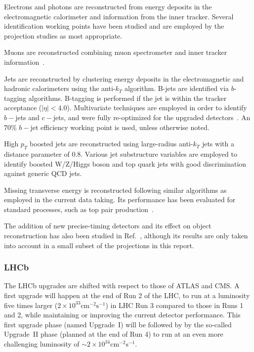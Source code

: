 Electrons and photons are reconstructed from energy deposits in the electromagnetic calorimeter and information from the inner tracker\cite{ATLAS_LAr_TDR,CMS_Barrel_TDR,Collaboration:2293646,CMS_MTD_TP}.
Several identification working points have been studied and are employed by the projection studies as most appropriate.

Muons are reconstructed combining muon spectrometer and inner tracker information~\cite{ATLAS_Muon_TDR,CMS_Muon_TDR}.

Jets are reconstructed by clustering energy deposits in the electromagnetic and hadronic calorimeters\cite{ATLAS_Tile_TDR,ATLAS_LAr_TDR,CMS_Barrel_TDR} using the anti-$k_{T}$ algorithm\cite{Cacciari:2008gp}.
B-jets are identified via $b$-tagging algorithms. B-tagging is performed if the jet is within the tracker acceptance ($|\eta|<4.0$).
Multivariate techniques are employed in order to identify $b-$jets and $c-$jets, and were fully re-optimized for the upgraded detectors~\cite{ATLAS_Pixel_TDR,CMS_Tracker_TDR}.
An 70\% $b-$jet efficiency working point is used, unless otherwise noted.

High $p_T$ boosted jets are reconstructed using large-radius anti-$k_{T}$ jets with a distance parameter of 0.8. Various jet substructure variables are employed to identify boosted W/Z/Higgs boson and top quark jets with good discrimination against generic QCD jets. 

Missing transverse energy is reconstructed following similar algorithms as employed in the current data taking.
Its performance has been evaluated for standard processes, such as top pair production~\cite{ATLAS_Pixel_TDR,Contardo:2020886}.

The addition of new precise-timing detectors and its effect on object reconstruction has also been studied in Ref.~\cite{ATLAS_TP_HGTD,CMS_MTD_TP}, although its results are only taken into account in a small subset of the projections in this report.

\subsubsection{LHCb}
\label{sec:methods:perf_LHCb}
The LHCb upgrades are shifted with respect to those of ATLAS and CMS. A first upgrade will happen at the end of Run 2 of the LHC, to run at a luminosity five times larger  ($2\times 10^{33}\text{cm}^{-2}\text{s}^{-1}$) in LHC Run 3 compared to those in Runs 1 and 2, while maintaining or improving the current detector performance. This first upgrade phase (named \mbox{Upgrade~I}) will be followed by by the so-called \mbox{Upgrade~II} phase (planned at the end of Run 4) to run at an even more challenging luminosity of $\sim 2\times 10^{34}\text{cm}^{-2}\text{s}^{-1}$.


